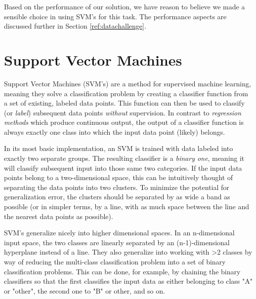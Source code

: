 \documentclass{netsec2012}
\begin{document}
Based on the performance of our solution, we have reason to believe we made a sensible choice in
using SVM's for this task.  The performance aspects are discussed further in Section
\ref{ref:datachallenge}.


\section{Support Vector Machines}

\label{ref:svmintro}

Support Vector Machines (SVM's) are a method for supervised machine learning, meaning they solve a
classification problem by creating a classifier function from a set of existing, labeled data
points.  This function can then be used to classify (or \emph{label}) subsequent data points
\emph{without} supervision.  In contrast to \emph{regression methods} which produce continuous
output, the output of a classifier function is always exactly one class into which the input data
point (likely) belongs.

In its most basic implementation, an SVM is trained with data labeled into exactly two separate
groups.  The resulting classifier is a \emph{binary one}, meaning it will classify subsequent input
into those same two categories.  If the input data points belong to a two-dimensional space, this
can be intuitively thought of separating the data points into two clusters.  To minimize the
potential for generalization error, the clusters should be separated by as wide a band as possible
(or in simpler terms, by a line, with as much space between the line and the nearest data points as
possible). \cite{svm_chemistry}

\label{ref:multiclasssvm}

SVM's generalize nicely into higher dimensional spaces.  In an n-dimensional input space, the two
classes are linearly separated by an (n-1)-dimensional hyperplane instead of a line.  They also
generalize into working with >2 classes by way of reducing the multi-class classification problem
into a set of binary classification problems.  This can be done, for example, by chaining the binary
classifiers so that the first classifies the input data as either belonging to class "A" or "other",
the second one to "B" or other, and so on. \cite{duan2005best}
\end{document}
